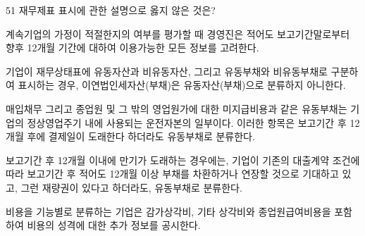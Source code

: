 \begin{question}{51}
재무제표 표시에 관한 설명으로 옳지 않은 것은?
\begin{choices}
  \item 계속기업의 가정이 적절한지의 여부를 평가할 때 경영진은 적어도 보고기간말로부터 향후 12개월 기간에 대하여 이용가능한 모든 정보를 고려한다.
  \item 기업이 재무상태표에 유동자산과 비유동자산, 그리고 유동부채와 비유동부채로 구분하여 표시하는 경우, 이연법인세자산(부채)은 유동자산(부채)으로 분류하지 아니한다.
  \item 매입채무 그리고 종업원 및 그 밖의 영업원가에 대한 미지급비용과 같은 유동부채는 기업의 정상영업주기 내에 사용되는 운전자본의 일부이다. 이러한 항목은 보고기간 후 12개월 후에 결제일이 도래한다 하더라도 유동부채로 분류한다.
  \item 보고기간 후 12개월 이내에 만기가 도래하는 경우에는, 기업이 기존의 대출계약 조건에 따라 보고기간 후 적어도 12개월 이상 부채를 차환하거나 연장할 것으로 기대하고 있고, 그런 재량권이 있다고 하더라도, 유동부채로 분류한다.
  \item 비용을 기능별로 분류하는 기업은 감가상각비, 기타 상각비와 종업원급여비용을 포함하여 비용의 성격에 대한 추가 정보를 공시한다.
\end{choices}
\end{question}
